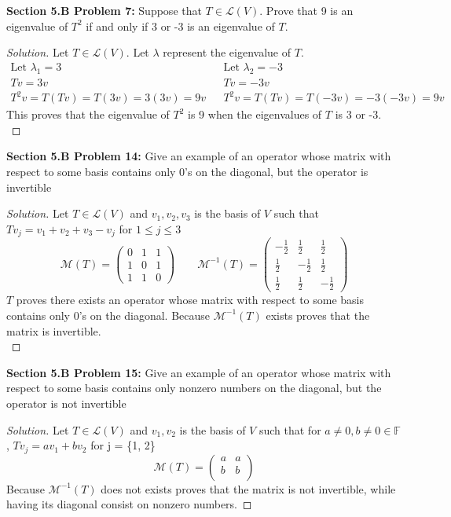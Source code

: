 \documentclass[12pt]{article}
\begin{document}
\noindent \textbf{Section 5.B Problem 7: }Suppose that $T \in \mathcal{L}(V)$. Prove that 9 is an eigenvalue of $T^2$ if and only if 3 or -3 is an eigenvalue of $T$.
	\begin{proof}[Solution]
		Let $T \in \mathcal{L}(V)$. Let $\lambda$ represent the eigenvalue of $T$.
		\begin{align*}
			\text{Let }\lambda_1 = 3 && \text{Let } \lambda_2 = -3 \\
			Tv = 3v && Tv = -3v \\
			T^2v = T(Tv) = T(3v) = 3(3v) = 9v && T^2v = T(Tv) = T(-3v) = -3(-3v) = 9v
		\end{align*}
		This proves that the eigenvalue of $T^2$ is 9 when the eigenvalues of $T$ is 3 or -3. \\
	\end{proof}
\newpage

\noindent \textbf{Section 5.B Problem 14: }Give an example of an operator whose matrix with respect to some basis
contains only 0’s on the diagonal, but the operator is invertible
	\begin{proof}[Solution]
		Let $T \in \mathcal{L}(V)$ and $v_1 ,v_2, v_3$ is the basis of $V$ such that \\$Tv_j = v_1 + v_2 + v_3 - v_j$ for $1 \leq j \leq 3$ 
		$$ \mathcal{M}(T) = 
		\begin{pmatrix}
			0 & 1 & 1 \\
			1 & 0 & 1 \\
			1 & 1 & 0 
		\end{pmatrix}
		\qquad \mathcal{M}^{-1}(T) =
		\begin{pmatrix}
			-\frac{1}{2} & \frac{1}{2} & \frac{1}{2} \\
			\frac{1}{2} & -\frac{1}{2} & \frac{1}{2} \\
			\frac{1}{2} & \frac{1}{2} & -\frac{1}{2} 
		\end{pmatrix} 
		$$
		$T$ proves there exists an operator whose matrix with respect to some basis contains only 0’s on the diagonal. Because $\mathcal{M}^{-1}(T)$ exists proves that the matrix is invertible. \\
	\end{proof}
\vspace{\baselineskip}

\noindent \textbf{Section 5.B Problem 15: }Give an example of an operator whose matrix with respect to some basis
contains only nonzero numbers on the diagonal, but the operator is not invertible
	\begin{proof}[Solution]
		Let $T \in \mathcal{L}(V)$ and $v_1, v_2$ is the basis of $V$ such that for $a \not = 0,b \not = 0 \in \mathbb{F}$, $Tv_j = av_1 + bv_2$ for j = \{1, 2\}
		$$ \mathcal{M}(T) =
		\begin{pmatrix}
			a & a \\
			b & b \\
		\end{pmatrix}
		$$
		Because $\mathcal{M}^{-1}(T)$ does not exists proves that the matrix is not invertible, while having its diagonal consist on nonzero numbers.
	\end{proof}
\end{document}

